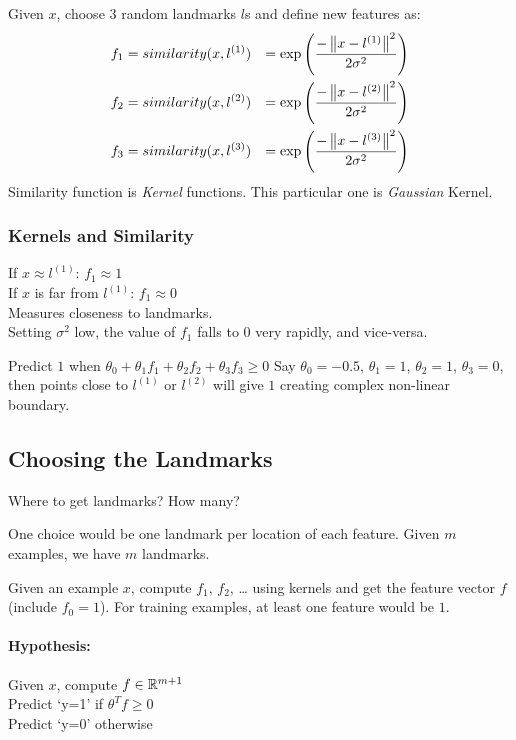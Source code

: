 Given $x$, choose $3$ random landmarks $l$s and define new features as:
\begin{align*}
	f_1 & = {similarity}(x, l^{(1)})
	    & = \exp\left(\frac{-\left\Vert x-l^{(1)} \right\Vert^2}{2\sigma^2}\right) \\
	f_2 & = {similarity}(x, l^{(2)})
	    & = \exp\left(\frac{-\left\Vert x-l^{(2)} \right\Vert^2}{2\sigma^2}\right) \\
	f_3 & = {similarity}(x, l^{(3)})
	    & = \exp\left(\frac{-\left\Vert x-l^{(3)} \right\Vert^2}{2\sigma^2}\right) \\
\end{align*}
Similarity function is \emph{Kernel} functions. This particular one is \emph{Gaussian} Kernel.

\subsubsection{Kernels and Similarity}
If $x \approx l^{(1)}$: $f_1 \approx 1$\\
If $x$ is far from $l^{(1)}$: $f_1 \approx 0$\\
Measures closeness to landmarks.\\
Setting $\sigma^2$ low, the value of $f_1$ falls to $0$ very rapidly, and vice-versa.

Predict $1$ when $\theta_0 + \theta_1f_1 + \theta_2f_2 + \theta_3f_3 \ge 0$
Say $\theta_0 = -0.5$, $\theta_1 = 1$, $\theta_2 = 1$, $\theta_3 = 0$, then
points close to $l^{(1)}$ or $l^{(2)}$ will give $1$ creating complex non-linear boundary.

\subsection{Choosing the Landmarks}
Where to get landmarks? How many?

One choice would be one landmark per location of each feature.
Given $m$ examples, we have $m$ landmarks.

Given an example $x$, compute $f_1$, $f_2$, \dots
using kernels and get the feature vector $f$ (include $f_0 = 1$). For training examples, at
least one feature would be $1$.

\paragraph{Hypothesis:} Given $x$, compute $f \in \mathbb{R}^{m+1}$\\
Predict `y=1' if $\theta^Tf \ge 0$\\
Predict `y=0' otherwise\\

